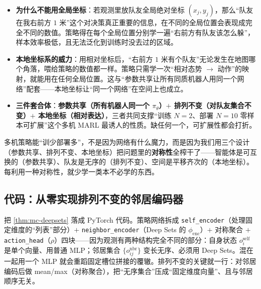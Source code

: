 \begin{itemize}
  \item \textbf{为什么不能用全局坐标}：若观测里放队友全局绝对坐标 $(x_j,y_j)$，那么“队友在我右前方 $1$ 米”这个对决策真正重要的信息，在不同的全局位置会表现成完全不同的数值。策略得在每个全局位置分别学一遍“右前方有队友该怎么躲”，样本效率极低，且无法泛化到训练时没去过的区域。
  \item \textbf{本地坐标系的威力}：用相对坐标后，“右前方 $1$ 米有个队友”无论发生在地图哪个角落，喂给策略的数值都一样。策略只需学一次“相对态势 $\to$ 动作”的映射，就能用在任何全局位置。这与“参数共享让所有同质机器人用同一个网络”配套——本地坐标让“同一个网络”在空间上也成立。
  \item \textbf{三件套合体}：\textbf{参数共享（所有机器人同一个 $\pi_\theta$）$+$ 排列不变（对队友集合不变）$+$ 本地坐标（相对表达）}，三者共同支撑“训练 $N{=}2$、部署 $N{=}10$ 零样本可扩展”这个多机 MARL 最诱人的性质。缺任何一个，可扩展性都会打折\cite{an2024perminv}。
\end{itemize}

\begin{insight}
多机策略能“训少部署多”，不是因为网络有什么魔力，而是因为我们用三个设计（参数共享、排列不变、本地坐标）把问题里的\textbf{对称性}全榨干了——智能体是可互换的（参数共享）、队友是无序的（排列不变）、空间是平移齐次的（本地坐标）。每利用一种对称性，就少学一类本不必学的东西。
\end{insight}

\subsection{代码：从零实现排列不变的邻居编码器}
\label{sec:mc-perminv-code}

把 \cref{thm:mc-deepsets} 落成 PyTorch 代码。策略网络拆成 \verb|self_encoder|（处理固定维度的“列表”部分）$+$ \verb|neighbor_encoder|（Deep Sets 的 $\phi_{\mathrm{enc}}$）$+$ 对称聚合 $+$ \verb|action_head|（$\rho$）四块——因为观测有两种结构完全不同的部分：自身状态 $o_i^{\text{self}}$ 是单个向量、用普通 MLP；邻居集合 $\{o_{ij}^{\text{nbr}}\}$ 变长无序、必须用 Deep Sets。混在一起用一个 MLP 就会重蹈固定槽位拼接的覆辙。排列不变的关键就一行：对邻居编码后做 mean/max（对称聚合），把“无序集合”压成“固定维度向量”、且与邻居顺序无关。

